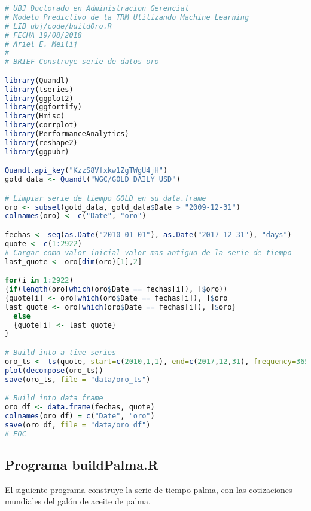 \begin{lstlisting}[language=R]
# UBJ Doctorado en Administracion Gerencial
# Modelo Predictivo de la TRM Utilizando Machine Learning
# LIB ubj/code/buildOro.R 
# FECHA 19/08/2018
# Ariel E. Meilij
#
# BRIEF Construye serie de datos oro

library(Quandl)
library(tseries)
library(ggplot2)
library(ggfortify)
library(Hmisc)
library(corrplot)
library(PerformanceAnalytics)
library(reshape2)
library(ggpubr)

Quandl.api_key("KzzS8Vfxkw1ZgTWgU4jH")
gold_data <- Quandl("WGC/GOLD_DAILY_USD")

# Limpiar serie de tiempo GOLD en su data.frame
oro <- subset(gold_data, gold_data$Date > "2009-12-31")
colnames(oro) <- c("Date", "oro")

fechas <- seq(as.Date("2010-01-01"), as.Date("2017-12-31"), "days")
quote <- c(1:2922)
# Cargar como valor inicial valor mas antiguo de la serie de tiempo
last_quote <- oro[dim(oro)[1],2]

for(i in 1:2922)
{if(length(oro[which(oro$Date == fechas[i]), ]$oro))
{quote[i] <- oro[which(oro$Date == fechas[i]), ]$oro
last_quote <- oro[which(oro$Date == fechas[i]), ]$oro}
  else
  {quote[i] <- last_quote}
}

# Build into a time series
oro_ts <- ts(quote, start=c(2010,1,1), end=c(2017,12,31), frequency=365)
plot(decompose(oro_ts))
save(oro_ts, file = "data/oro_ts")

# Build into data frame
oro_df <- data.frame(fechas, quote)
colnames(oro_df) = c("Date", "oro")
save(oro_df, file = "data/oro_df")
# EOC
\end{lstlisting}

\subsection{Programa buildPalma.R}
El siguiente programa construye la serie de tiempo palma, con las cotizaciones mundiales del galón de aceite de palma.

